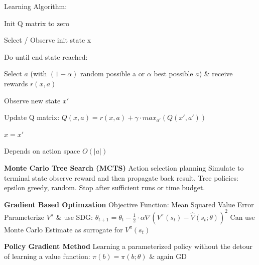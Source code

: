 \documentclass[a4paper, 11pt, landscape]{article}
\begin{document}
\begin{multicols*}{3}
Learning Algorithm:
\begin{compactitem}
	\item Init Q matrix to zero
	\item Select / Observe init state x
	\item Do until end state reached:
	\item Select $a$ (with $(1-\alpha)$ random possible a or $\alpha$ best possible $a$) \& receive rewards $r(x, a)$
	\item Observe new state $x'$
	\item Update Q matrix: $Q(x, a) = r(x, a) + \gamma \cdot max_{a'} (Q(x', a'))$
	\item $x = x'$
\end{compactitem}

Depends on action space $O(|a|)$


\textbf{Monte Carlo Tree Search (MCTS)}
Action selection planning
Simulate to terminal state observe reward and then propagate back result. Tree policies: epsilon greedy, random. Stop after sufficient runs or time budget.

\textbf{Gradient Based Optimzation}
Objective Function: Mean Squared Value Error
Parameterize $V^\pi$ \& use SDG:
$\theta_{t+1} = \theta_{t} - \frac{1}{2}\cdot\alpha\nabla(V^\pi(s_t) - \hat{V}(s_t; \theta ))^2$
Can use Monte Carlo Estimate as surrogate for $V^\pi(s_t)$

\textbf{Policy Gradient Method}
Learning a parameterized policy without the detour of learning a value function: $\pi(b) = \pi(b;\theta)$ \& again GD


\end{multicols*}
\end{document}
